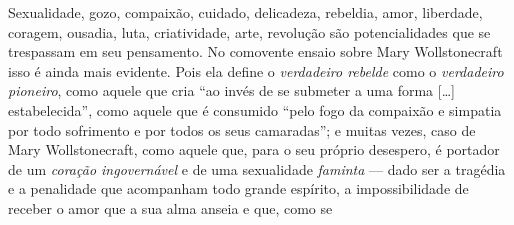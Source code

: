 Sexualidade, gozo,
compaixão, cuidado, delicadeza, rebeldia, amor, liberdade, coragem,
ousadia, luta, criatividade, arte, revolução são potencialidades que se
trespassam em seu pensamento. No comovente ensaio sobre Mary Wollstonecraft isso é
ainda mais evidente. Pois ela define o \textit{verdadeiro rebelde} como o
\textit{verdadeiro pioneiro}, como aquele que cria ``ao invés de se
submeter a uma forma {[}\ldots{]} estabelecida'', como aquele que é
consumido ``pelo fogo da compaixão e simpatia por todo sofrimento e por
todos os seus camaradas''; e muitas vezes, caso de Mary Wollstonecraft,
como aquele que, para o seu próprio desespero, é portador de um
\textit{coração ingovernável} e de uma sexualidade \textit{faminta} ---
dado ser a tragédia e a penalidade que acompanham todo grande espírito,
a impossibilidade de receber o amor que a sua alma anseia e que, como se
